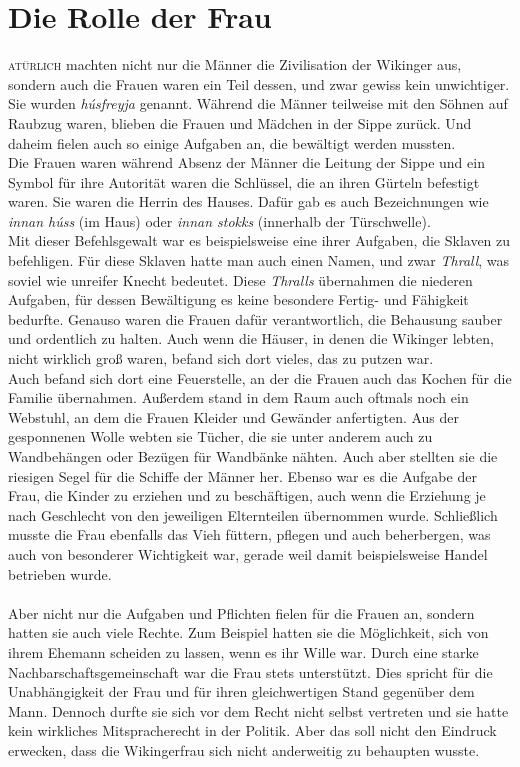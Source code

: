 \documentclass[12pt,a4paper,ngerman,openany]{book}
\newcommand{\flettrine}[2]{\lettrine[lines=2, depth=0, loversize=0.25, nindent=0.69pt, lraise=0.15]{\initfamily{#1}}{#2}}
\newcommand*\initfamily{\usefont{U}{GotIn}{xl}{n}}
\begin{document}
\section{Die Rolle der Frau}
\flettrine{N}{atürlich} machten nicht nur die Männer die Zivilisation der Wikinger aus, sondern auch die Frauen waren ein Teil dessen, und zwar gewiss kein unwichtiger. Sie wurden \textit{húsfreyja} genannt. Während die Männer teilweise mit den Söhnen auf Raubzug waren, blieben die Frauen und Mädchen in der Sippe zurück. Und daheim fielen auch so einige Aufgaben an, die bewältigt werden mussten.\\
Die Frauen waren während Absenz der Männer die Leitung der Sippe und ein Symbol für ihre Autorität waren die Schlüssel, die an ihren Gürteln befestigt waren. Sie waren die Herrin des Hauses. Dafür gab es auch Bezeichnungen wie \textit{innan húss} (im Haus) oder \textit{innan stokks} (innerhalb der Türschwelle).\\
Mit dieser Befehlsgewalt war es beispielsweise eine ihrer Aufgaben, die Sklaven zu befehligen. Für diese Sklaven hatte man auch einen Namen, und zwar \textit{Thrall}, was soviel wie \glqq unreifer Knecht\grqq{} bedeutet. Diese \textit{Thralls} übernahmen die niederen Aufgaben, für dessen Bewältigung es keine besondere Fertig- und Fähigkeit bedurfte. 
Genauso waren die Frauen dafür verantwortlich, die Behausung sauber und ordentlich zu halten. Auch wenn die Häuser, in denen die Wikinger lebten, nicht wirklich groß waren,
befand sich dort vieles, das zu putzen war.\\
Auch befand sich dort eine Feuerstelle, an der die Frauen auch das Kochen für die Familie übernahmen. Außerdem stand in dem Raum auch oftmals noch ein Webstuhl, an dem die Frauen Kleider und Gewänder anfertigten. Aus der gesponnenen Wolle webten sie Tücher, die sie unter anderem auch zu Wandbehängen oder Bezügen für Wandbänke nähten. Auch aber stellten sie die riesigen Segel für die Schiffe der Männer her.
Ebenso war es die Aufgabe der Frau, die Kinder zu erziehen und zu beschäftigen, auch wenn die Erziehung je nach Geschlecht von den jeweiligen Elternteilen übernommen wurde.
Schließlich musste die Frau ebenfalls das Vieh füttern, pflegen und auch beherbergen, was auch von besonderer Wichtigkeit war, gerade weil damit beispielsweise Handel betrieben wurde.\\\\
Aber nicht nur die Aufgaben und Pflichten fielen für die Frauen an, sondern hatten sie auch viele Rechte. Zum Beispiel hatten sie die Möglichkeit, sich von ihrem Ehemann scheiden zu lassen, wenn es ihr Wille war. Durch eine starke Nachbarschaftsgemeinschaft war die Frau stets unterstützt. Dies spricht für die Unabhängigkeit der Frau und für ihren gleichwertigen Stand gegenüber dem Mann. Dennoch durfte sie sich vor dem Recht nicht selbst vertreten und sie hatte kein wirkliches Mitspracherecht in der Politik. Aber das soll nicht den Eindruck erwecken, dass die Wikingerfrau sich nicht anderweitig zu behaupten wusste.\\
\end{document}
